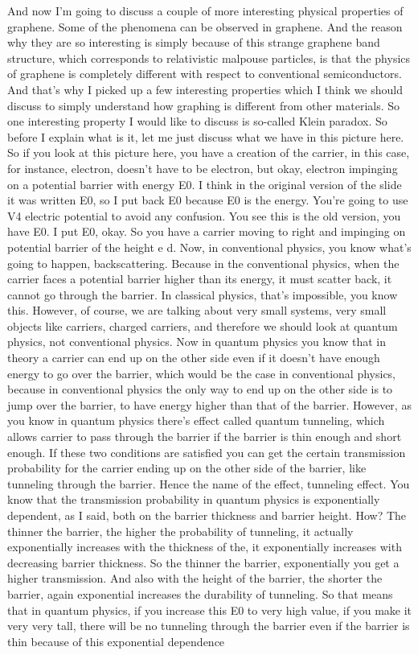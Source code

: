 And now I'm going to discuss a couple of more interesting physical properties of graphene. Some of the phenomena can be observed in graphene. And the reason why they are so interesting is simply because of this strange graphene band structure, which corresponds to relativistic malpouse particles, is that the physics of graphene is completely different with respect to conventional semiconductors. And that's why I picked up a few interesting properties which I think we should discuss to simply understand how graphing is different from other materials. So one interesting property I would like to discuss is so-called Klein paradox. So before I explain what is it, let me just discuss what we have in this picture here. So if you look at this picture here, you have a creation of the carrier, in this case, for instance, electron, doesn't have to be electron, but okay, electron impinging on a potential barrier with energy E0. I think in the original version of the slide it was written E0, so I put back E0 because E0 is the energy. You're going to use V4 electric potential to avoid any confusion. You see this is the old version, you have E0. I put E0, okay. So you have a carrier moving to right and impinging on potential barrier of the height e d. Now, in conventional physics, you know what's going to happen, backscattering. Because in the conventional physics, when the carrier faces a potential barrier higher than its energy, it must scatter back, it cannot go through the barrier. In classical physics, that's impossible, you know this. However, of course, we are talking about very small systems, very small objects like carriers, charged carriers, and therefore we should look at quantum physics, not conventional physics. Now in quantum physics you know that in theory a carrier can end up on the other side even if it doesn't have enough energy to go over the barrier, which would be the case in conventional physics, because in conventional physics the only way to end up on the other side is to jump over the barrier, to have energy higher than that of the barrier. However, as you know in quantum physics there's effect called quantum tunneling, which allows carrier to pass through the barrier if the barrier is thin enough and short enough. If these two conditions are satisfied you can get the certain transmission probability for the carrier ending up on the other side of the barrier, like tunneling through the barrier. Hence the name of the effect, tunneling effect. You know that the transmission probability in quantum physics is exponentially dependent, as I said, both on the barrier thickness and barrier height. How? The thinner the barrier, the higher the probability of tunneling, it actually exponentially increases with the thickness of the, it exponentially increases with decreasing barrier thickness. So the thinner the barrier, exponentially you get a higher transmission. And also with the height of the barrier, the shorter the barrier, again exponential increases the durability of tunneling. So that means that in quantum physics, if you increase this E0 to very high value, if you make it very very tall, there will be no tunneling through the barrier even if the barrier is thin because of this exponential dependence 